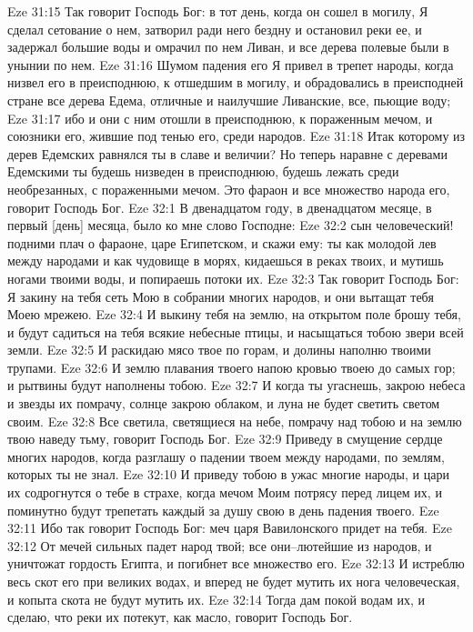 Eze 31:15  Так говорит Господь Бог: в тот день, когда он сошел в могилу, Я сделал сетование о нем, затворил ради него бездну и остановил реки ее, и задержал большие воды и омрачил по нем Ливан, и все дерева полевые были в унынии по нем.
Eze 31:16  Шумом падения его Я привел в трепет народы, когда низвел его в преисподнюю, к отшедшим в могилу, и обрадовались в преисподней стране все дерева Едема, отличные и наилучшие Ливанские, все, пьющие воду;
Eze 31:17  ибо и они с ним отошли в преисподнюю, к пораженным мечом, и союзники его, жившие под тенью его, среди народов.
Eze 31:18  Итак которому из дерев Едемских равнялся ты в славе и величии? Но теперь наравне с деревами Едемскими ты будешь низведен в преисподнюю, будешь лежать среди необрезанных, с пораженными мечом. Это фараон и все множество народа его, говорит Господь Бог.
Eze 32:1  В двенадцатом году, в двенадцатом месяце, в первый [день] месяца, было ко мне слово Господне:
Eze 32:2  сын человеческий! подними плач о фараоне, царе Египетском, и скажи ему: ты как молодой лев между народами и как чудовище в морях, кидаешься в реках твоих, и мутишь ногами твоими воды, и попираешь потоки их.
Eze 32:3  Так говорит Господь Бог: Я закину на тебя сеть Мою в собрании многих народов, и они вытащат тебя Моею мрежею.
Eze 32:4  И выкину тебя на землю, на открытом поле брошу тебя, и будут садиться на тебя всякие небесные птицы, и насыщаться тобою звери всей земли.
Eze 32:5  И раскидаю мясо твое по горам, и долины наполню твоими трупами.
Eze 32:6  И землю плавания твоего напою кровью твоею до самых гор; и рытвины будут наполнены тобою.
Eze 32:7  И когда ты угаснешь, закрою небеса и звезды их помрачу, солнце закрою облаком, и луна не будет светить светом своим.
Eze 32:8  Все светила, светящиеся на небе, помрачу над тобою и на землю твою наведу тьму, говорит Господь Бог.
Eze 32:9  Приведу в смущение сердце многих народов, когда разглашу о падении твоем между народами, по землям, которых ты не знал.
Eze 32:10  И приведу тобою в ужас многие народы, и цари их содрогнутся о тебе в страхе, когда мечом Моим потрясу перед лицем их, и поминутно будут трепетать каждый за душу свою в день падения твоего.
Eze 32:11  Ибо так говорит Господь Бог: меч царя Вавилонского придет на тебя.
Eze 32:12  От мечей сильных падет народ твой; все они--лютейшие из народов, и уничтожат гордость Египта, и погибнет все множество его.
Eze 32:13  И истреблю весь скот его при великих водах, и вперед не будет мутить их нога человеческая, и копыта скота не будут мутить их.
Eze 32:14  Тогда дам покой водам их, и сделаю, что реки их потекут, как масло, говорит Господь Бог.
